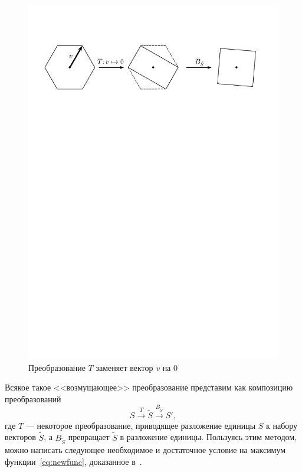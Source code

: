 \documentclass[a4paper,12pt]{article}
\numberwithin{equation}{section}
\begin{document}
	\begin{figure}[h!]
		\begin{center}
			\includegraphics[scale=0.8]{pics/pertubation/pic.pdf}
		\end{center}
		\caption{Преобразование $T$ заменяет вектор $v$ на 0}
	\end{figure}
	Всякое такое <<возмущающее>> преобразование представим как композицию преобразований
	\begin{equation}
		S\xrightarrow{T}\tilde{S}\xrightarrow{B_{\tilde{S}}} S',
	\end{equation}
	где $T$ --- некоторое преобразование, приводящее разложение единицы $S$ к набору векторов $\tilde{S}$, а $B_{\tilde{S}}$ превращает $\tilde{S}$ в разложение единицы. Пользуясь этим методом, можно написать следующее необходимое и достаточное условие на максимум функции~\eqref{eq:newfunc}, доказанное в~\cite{crospol}.
\end{document}
